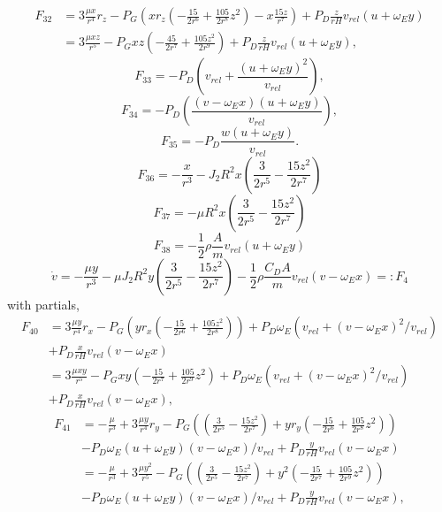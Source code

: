 \documentclass[]{article}
\begin{document}
\begin{eqnarray}
F_{32} & =  3 \frac{\mu x}{r^4} r_z - P_G  \left( x r_z \left( -\frac{15}{2 r^6} + \frac{105}{2r^8}z^2 \right) - x\frac{15 z}{r^7} \right) +  P_D \frac{z}{r H} v_{rel} (u+\omega_E y)  \\
& =  3 \frac{\mu x z}{r^5} - P_G  x z \left( -\frac{45}{2 r^7} + \frac{105z^2}{2r^9}  \right) +  P_D \frac{z}{r H} v_{rel} (u+\omega_E y),
\end{eqnarray}
$$
F_{33} = -P_D \left( v_{rel} + \frac{(u+\omega_E y)^2}{v_{rel}} \right),
$$
$$
F_{34} = -P_D \left(  \frac{(v-\omega_E x)(u+\omega_E y)}{v_{rel}} \right),
$$
$$
F_{35} = -P_D \frac{w (u+\omega_E y)}{v_{rel}}.
$$
$$
F_{36} = -\frac{x}{r^3} - J_2 R^2  x \left( \frac{3}{2r^5} - \frac{15z^2}{2r^7} \right) 
$$
$$
F_{37} = - \mu R^2  x \left( \frac{3}{2r^5} - \frac{15z^2}{2r^7} \right) 
$$
$$
F_{38} = - \frac{1}{2} \rho \frac{A}{m} v_{rel} (u+\omega_E y)
$$
\newpage
$$
\dot{v} =  -\frac{\mu y}{r^3} - \mu J_2 R^2 y  \left( \frac{3}{2r^5} - \frac{15z^2}{2r^7} \right) - \frac{1}{2} \rho \frac{C_D A}{m} v_{rel}  \left(v - \omega_E x \right) =: F_4
$$
with partials,
\begin{eqnarray}
F_{40} & =  3 \frac{\mu y}{r^4} r_x - P_G \left( y r_x \left( -\frac{15}{2 r^6} + \frac{105z^2}{2r^8} \right) \right) + P_D  \omega_E   \left(v_{rel} +  (v-\omega_E x)^2/v_{rel} \right) \nonumber \\
& +  P_D \frac{x}{r H} v_{rel} (v-\omega_E x) \nonumber \\
& =  3 \frac{\mu x y}{r^5} - P_G  x y \left( -\frac{15}{2 r^7} + \frac{105}{2r^9}z^2  \right) + P_D  \omega_E   \left(v_{rel} +  (v-\omega_E x)^2/v_{rel} \right) \nonumber \\
&  +  P_D \frac{x}{r H} v_{rel} (v-\omega_E x),
\end{eqnarray}
\begin{eqnarray}
F_{41} & = -\frac{\mu}{r^3} + 3 \frac{\mu y}{r^4} r_y - P_G \left( \left( \frac{3}{2r^5} - \frac{15z^2}{2r^7} \right) + y r_y \left( -\frac{15}{2 r^6} + \frac{105}{2r^8}z^2 \right) \right) \\
& - P_D \omega_E (u+\omega_E y) (v-\omega_E x)/v_{rel} + P_D \frac{y}{r H} v_{rel} (v-\omega_E x)  \\
& = -\frac{\mu}{r^3} + 3 \frac{\mu y^2}{r^5}  - P_G \left( \left( \frac{3}{2r^5} - \frac{15z^2}{2r^7} \right) + y^2 \left( -\frac{15}{2 r^7} + \frac{105}{2r^9}z^2 \right) \right) \\
&  - P_D \omega_E (u+\omega_E y) (v-\omega_E x)/v_{rel} + P_D \frac{y}{r H} v_{rel} (v-\omega_E x),
\end{eqnarray}
\end{document}
